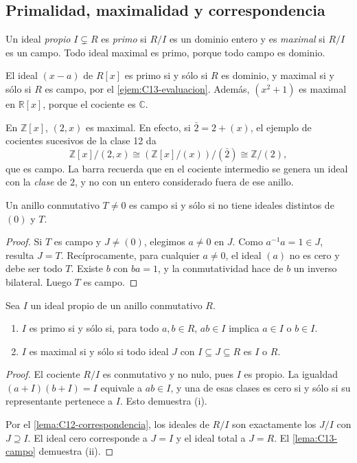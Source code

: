 \subsection{Primalidad, maximalidad y correspondencia}
\begin{defi}
Un ideal \emph{propio} $I\subsetneq R$ es \emph{primo} si $R/I$ es un dominio entero y es \emph{maximal} si $R/I$ es un campo. Todo ideal maximal es primo, porque todo campo es dominio.
\end{defi}

\begin{ejem}
El ideal $(x-a)$ de $R[x]$ es primo si y sólo si $R$ es dominio, y maximal si y sólo si $R$ es campo, por el \cref{ejem:C13-evaluacion}. Además, $(x^2+1)$ es maximal en $\mathbb R[x]$, porque el cociente es $\mathbb C$.

En $\mathbb Z[x]$, $(2,x)$ es maximal. En efecto, si $\bar2=2+(x)$, el ejemplo de cocientes sucesivos de la clase 12 da
\[
\mathbb Z[x]/(2,x)
\cong (\mathbb Z[x]/(x))/(\bar2)
\cong\mathbb Z/(2),
\]
que es campo. La barra recuerda que en el cociente intermedio se genera un ideal con la \emph{clase} de $2$, y no con un entero considerado fuera de ese anillo.
\end{ejem}

\begin{lema}\label{lema:C13-campo}
Un anillo conmutativo $T\ne0$ es campo si y sólo si no tiene ideales distintos de $(0)$ y $T$.
\end{lema}
\begin{proof}
Si $T$ es campo y $J\ne(0)$, elegimos $a\ne0$ en $J$. Como $a^{-1}a=1\in J$, resulta $J=T$. Recíprocamente, para cualquier $a\ne0$, el ideal $(a)$ no es cero y debe ser todo $T$. Existe $b$ con $ba=1$, y la conmutatividad hace de $b$ un inverso bilateral. Luego $T$ es campo.
\end{proof}

\begin{prop}\label{prop:C13-criterios}
Sea $I$ un ideal propio de un anillo conmutativo $R$.
\begin{enumerate}[label=\textup{(\roman*)}]
\item $I$ es primo si y sólo si, para todo $a,b\in R$, $ab\in I$ implica $a\in I$ o $b\in I$.
\item $I$ es maximal si y sólo si todo ideal $J$ con $I\subseteq J\subseteq R$ es $I$ o $R$.
\end{enumerate}
\end{prop}
\begin{proof}
El cociente $R/I$ es conmutativo y no nulo, pues $I$ es propio. La igualdad $(a+I)(b+I)=I$ equivale a $ab\in I$, y una de esas clases es cero si y sólo si su representante pertenece a $I$. Esto demuestra (i).

Por el \cref{lema:C12-correspondencia}, los ideales de $R/I$ son exactamente los $J/I$ con $J\supseteq I$. El ideal cero corresponde a $J=I$ y el ideal total a $J=R$. El \cref{lema:C13-campo} demuestra (ii).
\end{proof}

